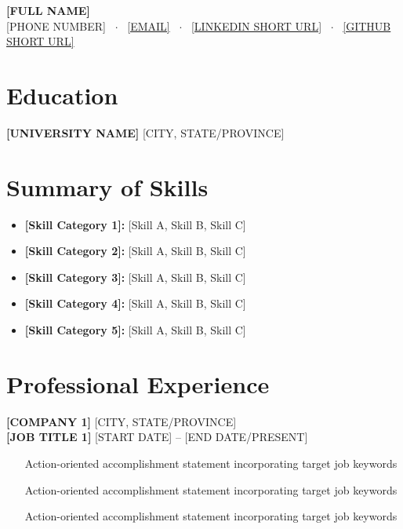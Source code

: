 \documentclass[10pt,letterpaper]{article}
\begin{document}
\begin{center}
    {\LARGE \textbf{\color{darkblue}[FULL NAME]}} \\ \vspace{3pt}
    [PHONE NUMBER] \ $\cdot$ \ \href{mailto:[EMAIL]}{[EMAIL]} \ $\cdot$ \ \href{https://[LINKEDIN URL]}{[LINKEDIN SHORT URL]} \ $\cdot$ \ \href{https://[GITHUB URL]}{[GITHUB SHORT URL]}
\end{center}

\section{Education}
\textbf{[UNIVERSITY NAME]} \hfill [CITY, STATE/PROVINCE] \\
[DEGREE TYPE (e.g., Bachelor of Engineering (B.Eng.)) in FIELD]

\section{Summary of Skills}
\begin{itemize}
    \item \textbf{[Skill Category 1]:} [Skill A, Skill B, Skill C]
    \item \textbf{[Skill Category 2]:} [Skill A, Skill B, Skill C]
    \item \textbf{[Skill Category 3]:} [Skill A, Skill B, Skill C]
    \item \textbf{[Skill Category 4]:} [Skill A, Skill B, Skill C]
    \item \textbf{[Skill Category 5]:} [Skill A, Skill B, Skill C]
\end{itemize}

\section{Professional Experience}

\textbf{[COMPANY 1]} \hfill [CITY, STATE/PROVINCE] \\
{\small\textbf{[JOB TITLE 1]}} \hfill [START DATE] -- [END DATE/PRESENT]
\begin{itemize}
    \item [Action-oriented accomplishment statement incorporating target job keywords]
    \item [Action-oriented accomplishment statement incorporating target job keywords]
    \item [Action-oriented accomplishment statement incorporating target job keywords]
\end{itemize}
\end{document}
